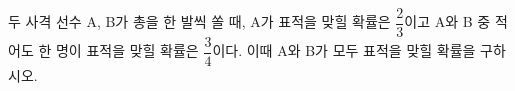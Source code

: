두 사격 선수 A, B가 총을 한 발씩 쏠 때, A가 표적을 맞힐 확률은 $\dfrac{2}{3}$이고 A와 B 중 적어도 한 명이 표적을 맞힐 확률은 $\dfrac{3}{4}$이다. 이때 A와 B가 모두 표적을 맞힐 확률을 구하시오.
